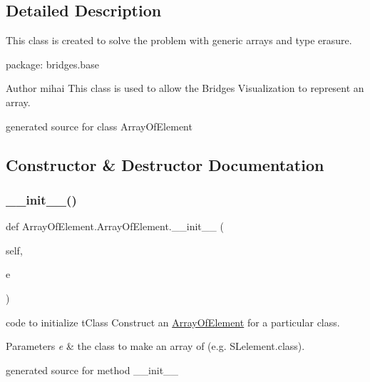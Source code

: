\subsection{Detailed Description}
This class is created to solve the problem with generic arrays and type erasure. 

package\+: bridges.\+base

\begin{DoxyAuthor}{Author}
mihai This class is used to allow the Bridges Visualization to represent an array.\begin{DoxyVerb}generated source for class ArrayOfElement \end{DoxyVerb}
 
\end{DoxyAuthor}


\subsection{Constructor \& Destructor Documentation}
\hypertarget{class_array_of_element_1_1_array_of_element_a86dd11f48e2c074b58b89c6ecfab738a}{}\label{class_array_of_element_1_1_array_of_element_a86dd11f48e2c074b58b89c6ecfab738a} 
\subsubsection{\texorpdfstring{\+\_\+\+\_\+init\+\_\+\+\_\+()}{\_\_init\_\_()}}
{\footnotesize\ttfamily def Array\+Of\+Element.\+Array\+Of\+Element.\+\_\+\+\_\+init\+\_\+\+\_\+ (\begin{DoxyParamCaption}\item[{}]{self,  }\item[{}]{e }\end{DoxyParamCaption})}



code to initialize t\+Class Construct an \hyperlink{class_array_of_element_1_1_array_of_element}{Array\+Of\+Element} for a particular class. 


\begin{DoxyParams}{Parameters}
{\em e} & the class to make an array of (e.\+g. S\+Lelement.\+class).\begin{DoxyVerb}generated source for method __init__ \end{DoxyVerb}
 \\
\hline
\end{DoxyParams}


